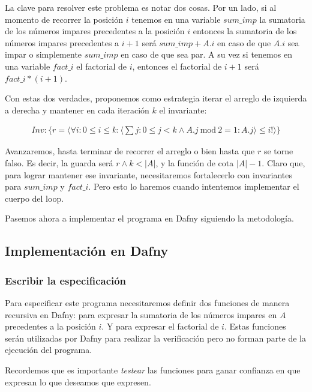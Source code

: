 \documentclass[12pt, a4paper, openany, fleqn]{book}
\begin{document}
    La clave para resolver este problema es notar dos cosas. Por un lado, si al momento de recorrer la posición $i$ tenemos en una variable $sum\_imp$ la sumatoria de los números impares precedentes a la posición $i$ entonces la sumatoria de los números impares precedentes a $i+1$ será $sum\_imp + A.i$ en caso de que $A.i$ sea impar o simplemente $sum\_imp$ en caso de que sea par.
    A su vez si tenemos en una variable $fact\_i$ el factorial de $i$, entonces el factorial de $i+1$ será  $fact\_i * (i+1)$.

    Con estas dos verdades, proponemos como estrategia iterar el arreglo de izquierda a derecha y mantener en cada iteración $k$ el invariante:

    \begin{align*}
        Inv: \{r = \langle\forall i : 0 \leqslant i \leqslant k : \langle\sum j : 0 \leqslant j < k \land A.j\ \text{mod}\ 2 = 1 : A.j\rangle \leqslant i! \rangle \}
    \end{align*}

    Avanzaremos, hasta terminar de recorrer el arreglo o bien hasta que $r$ se torne falso. Es decir, la guarda será $r \land k < |A|$, y la función de cota $|A| - 1$.
    Claro que, para lograr mantener ese invariante, necesitaremos fortalecerlo con invariantes para $sum\_imp$ y $fact\_i$. Pero esto lo haremos cuando intentemos implementar el cuerpo del loop.

    Pasemos ahora a implementar el programa en Dafny siguiendo la metodología.

    \subsection*{Implementación en Dafny}

    \subsubsection*{Escribir la especificación}
    Para especificar este programa necesitaremos definir dos funciones de manera recursiva en Dafny:  para expresar la sumatoria de los números impares en $A$ precedentes a la posición $i$. Y  para expresar el factorial de $i$. Estas funciones serán utilizadas por Dafny para realizar la verificación pero no forman parte de la ejecución del programa.

    Recordemos que es importante \textit{testear} las funciones para ganar confianza en que expresan lo que deseamos que expresen.
\end{document}
